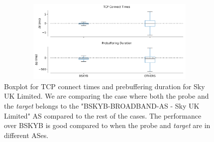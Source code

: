 \begin{figure}[!ht]
	\centering
	\includegraphics[keepaspectratio, height=4cm, width=15cm]{figures/tcp/netflix-delay-boxplot-bskyb.pdf}
	\caption[TCP Connect Times and Prebuffering Duration Boxplot for BSKYB]{Boxplot for TCP connect times and prebuffering duration for Sky UK Limited. We are comparing the case where both the probe and the \textit{target} belongs to the "BSKYB-BROADBAND-AS - Sky UK Limited" AS compared to the rest of the cases. The performance over BSKYB is good compared to when the probe and \textit{target} are in different ASes.}
	\label{fig:TCP Connect Times and Prebuffering Duration Boxplot for BSKYB}
\end{figure}

\FloatBarrier
